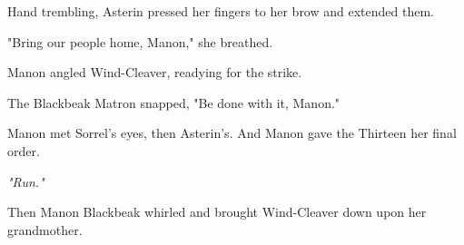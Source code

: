 Hand trembling, Asterin pressed her fingers to her brow and extended them.

"Bring our people home, Manon," she breathed.

Manon angled Wind-Cleaver, readying for the strike.

The Blackbeak Matron snapped, "Be done with it, Manon."

Manon met Sorrel's eyes, then Asterin's. And Manon gave the Thirteen her final order.

\emph{"Run."}

Then Manon Blackbeak whirled and brought Wind-Cleaver down upon her grandmother.
